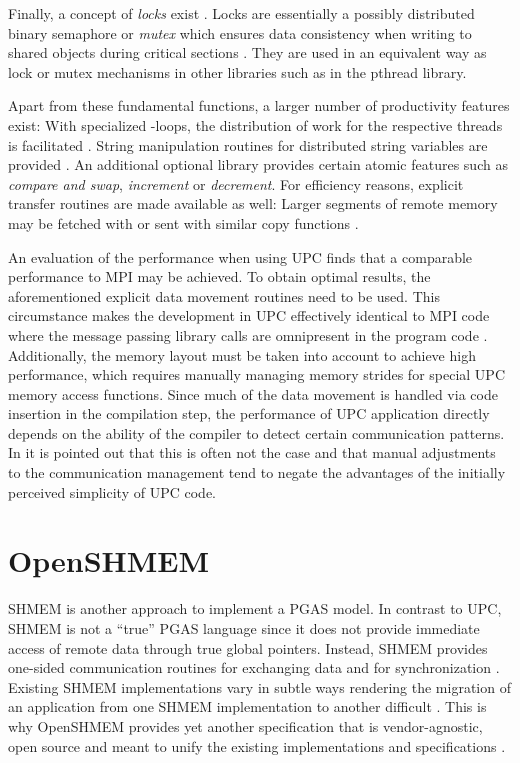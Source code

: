 Finally, a concept of \emph{locks} exist \cite[ch.~6.3]{upc}. Locks are essentially a possibly distributed binary semaphore or \emph{mutex} which ensures data consistency when writing to shared objects during critical sections \cite[ch.~5.5]{silberschatz}. They are used in an equivalent way as lock or mutex mechanisms in other libraries such as in the pthread library.

Apart from these fundamental functions, a larger number of productivity features exist: With specialized -loops, the distribution of work for the respective threads is facilitated \cite[ch.~6.6.2]{upc-std}. String manipulation routines for distributed string variables are provided \cite[ch.~7.2.5]{upc-std}. An additional optional library provides certain atomic features such as \emph{compare and swap}, \emph{increment} or \emph{decrement}. For efficiency reasons, explicit transfer routines are made available as well: Larger segments of remote memory may be fetched with  or sent with similar copy functions \cite[ch.~7.9.4]{upc}.

An evaluation of the performance when using \ac{UPC} finds that a comparable performance to \ac{MPI} may be achieved. To obtain optimal results, the aforementioned explicit data movement routines need to be used. This circumstance makes the development in \ac{UPC} effectively identical to \ac{MPI} code where the message passing  library calls are omnipresent in the program code \cite{upc-eval}. Additionally, the memory layout must be taken into account to achieve high performance, which requires manually managing memory strides for special \ac{UPC} memory access functions. Since much of the data movement is handled via code insertion in the compilation step, the performance of \ac{UPC} application directly depends on the ability of the compiler to detect certain communication patterns. In \cite{upc-eval} it is pointed out that this is often not the case and that manual adjustments to the communication management tend to negate the advantages of the initially perceived simplicity of \ac{UPC} code.

\section{\acs{OpenSHMEM}}
\label{sec:background:openshmem}

\ac{SHMEM} is another approach to implement a \ac{PGAS} model. In contrast to \ac{UPC}, \ac{SHMEM} is not a \enquote{true} \ac{PGAS} language since it does not provide immediate access of remote data through true global pointers. Instead, \ac{SHMEM} provides one-sided communication routines for exchanging data and for synchronization \cite[ch.~1.1]{oshm-intro}. Existing \ac{SHMEM} implementations vary in subtle ways rendering the migration of an application from one \ac{SHMEM} implementation to another difficult \cite[ch.~2.2]{oshm-intro}. This is why \ac{OpenSHMEM} provides yet another specification that is vendor-agnostic, open source and meant to unify the existing implementations and specifications \cite[p.~27]{oshm-tut}.

